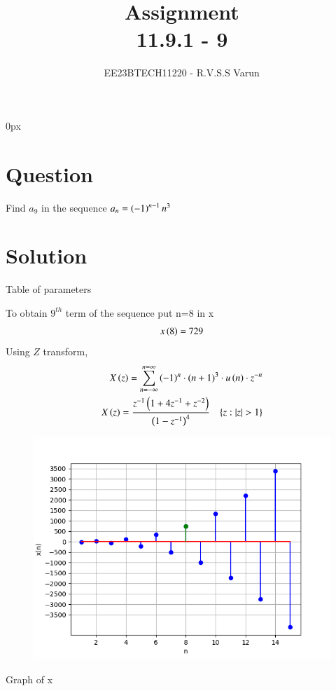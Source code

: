 \documentclass[beamer]{IEEEtran}
\theoremstyle{remark}
\begin{document}
\parindent 0px


\title{Assignment\\[1ex]11.9.1 - 9}
\author{EE23BTECH11220 - R.V.S.S Varun$^{}$%
}
\maketitle
\newpage
\bigskip

\renewcommand{\thefigure}{\theenumi}
\renewcommand{\thetable}{\theenumi}
\section*{Question}
Find $a_{9}$ in the sequence $a_{n}=\left(-1\right)^{n-1}n^{3}$ 
\section*{Solution}
 
\begin{table}[h]
    \centering
   
    
    \caption{Table of parameters}
    \label{tab:my_label}
\end{table}


To obtain $9^{th}$ term of the sequence put n=8 in x
\begin{align}
x\left(8\right)=729
\end{align}
Using  $Z$ transform,
\begin{align}
X\brak{z}=\sum_{n=-\infty}^{n=\infty}\brak{-1}^{n}\cdot (n+1)^{3}\cdot u\brak{n}\cdot z^{-n}\\
X\brak{z}=\frac{z^{-1}\brak{1+4z^{-1}+z^{-2}}}{\brak{1-z^{-1}}^{4}}\hspace{10pt}
\{z:|z|>1\}
\end{align} 

\begin{figure}[h]
    \centering
    \includegraphics[width=1 \columnwidth]{figs/graph.png} 
    \label{fig:enter-label}
\end{figure}
\begin{center}
Graph of x
   \end{center}
\end{document}
